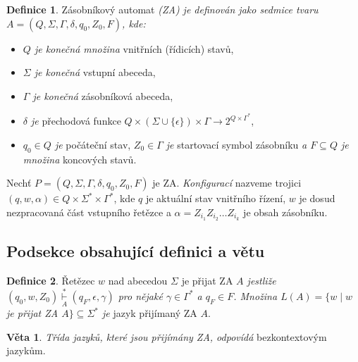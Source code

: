 \documentclass[11pt, a4paper, twocolumn]{article}
\theoremstyle{definition}
\newtheorem{definice}{Definice}
\newtheorem{veta}{Věta}
\begin{document}
\medskip

\begin{definice} \label{definice1}
Zásobníkový automat \emph{(ZA) je definován jako sedmice tvaru $A = (Q, \Sigma, \Gamma, \delta, q_0, Z_0, F)$, kde:} 

\medskip

\begin{itemize} \setlength \itemsep{1em} %
    \item \emph{$Q$ je konečná množina} vnitřních (řídicích) stavů,
    \item \emph{$\Sigma$ je konečná} vstupní abeceda,
    \item \emph{$\Gamma$ je konečná} zásobníková abeceda,
    \item \emph{$\delta$ je} přechodová funkce $Q \times (\Sigma\cup\{\epsilon\}) \times \Gamma \rightarrow 2^{Q \times \Gamma^*}$,
    \item \emph{$q_0 \in Q$ je} počáteční stav, \emph{$Z_0 \in \Gamma$ je} startovací symbol zásobníku \emph{a $F \subseteq Q$ je množina} koncových stavů.
\end{itemize}

\medskip

Nechť $P = (Q, \Sigma, \Gamma, \delta, q_0, Z_0, F)$ je ZA. \emph{Konfigurací} nazveme trojici $(q, w, \alpha) \in Q \times \Sigma^* \times \Gamma^*$, kde $q$ je aktuální stav vnitřního řízení, $w$ je dosud nezpracovaná část vstup\-ní\-ho řetězce a $\alpha = Z_{i_1} Z_{i_2} \dots Z_{i_k}$ je obsah zásobníku.
\end{definice}

\subsection{Podsekce obsahující definici a větu}

\begin{definice}
    Řetězec $w$ nad abecedou $\Sigma$ je přijat ZA \emph{$A$ jest\-li\-že $(q_0, w, Z_0) \overset{\ast}{\underset{A}{\vdash}} (q_F, \epsilon, \gamma)$ pro nějaké $\gamma \in \Gamma^*$ a $q_F \in F$. Množina $L(A) = \{w \mid w$ je přijat ZA $A\} \subseteq \Sigma^*$ je} jazyk přijímaný ZA $A$.
\end{definice}

\medskip

\begin{veta}
    \emph{Třída jazyků, které jsou přijímány ZA, odpovídá} bezkontextovým jazykům.
\end{veta}
\end{document}
